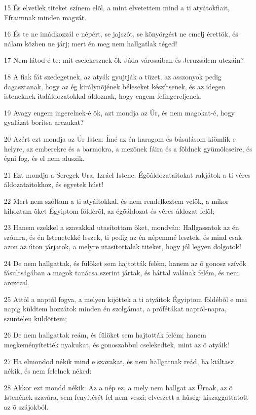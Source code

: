 \par 15 És elvetlek titeket színem elõl, a mint elvetettem mind a ti atyátokfiait, Efraimnak minden magvát.
\par 16 És te ne imádkozzál e népért, se jajszót, se könyörgést ne emelj érettök, és nálam közben ne járj; mert én meg nem hallgatlak téged!
\par 17 Nem látod-é te: mit cselekesznek õk Júda városaiban és Jeruzsálem utczáin?
\par 18 A fiak fát szedegetnek, az atyák gyujtják a tüzet, az asszonyok pedig dagasztanak, hogy az ég királynõjének béleseket készítsenek, és az idegen isteneknek italáldozatokkal áldoznak, hogy engem felingereljenek.
\par 19 Avagy engem ingerelnek-é õk, azt mondja az Úr, és nem magokat-é, hogy gyalázat borítsa arczukat?
\par 20 Azért ezt mondja az Úr Isten: Ímé az én haragom és búsulásom kiömlik e helyre, az emberekre és a barmokra, a mezõnek fáira és a földnek gyümölcseire, és égni fog, és el nem aluszik.
\par 21 Ezt mondja a Seregek Ura, Izráel Istene: Égõáldozataitokat rakjátok a ti véres áldozataitokhoz, és egyetek húst!
\par 22 Mert nem szóltam a ti atyáitokkal, és nem rendelkeztem velök, a mikor kihoztam õket Égyiptom földérõl, az égõáldozat és véres áldozat felõl;
\par 23 Hanem ezekkel a szavakkal utasítottam õket, mondván: Hallgassatok az én szómra, és én  Istenetekké leszek, ti pedig az én népemmé lesztek, és mind csak azon az úton járjatok, a melyre utasítottalak titeket, hogy jól legyen dolgotok!
\par 24 De nem hallgattak, és fülöket sem hajtották felém, hanem az õ gonosz szívök fásultságában a magok tanácsa szerint jártak, és háttal valának felém, és nem arczczal.
\par 25 Attól a naptól fogva, a melyen kijöttek a ti atyáitok Égyiptom földébõl e mai napig küldtem hozzátok minden én szolgámat, a prófétákat napról-napra, szüntelen küldöttem;
\par 26 De nem hallgattak reám, és fülöket sem hajtották felém; hanem megkeményítették nyakukat, és gonoszabbul cselekedtek, mint az õ atyáik!
\par 27 Ha elmondod nékik mind e szavakat, és nem hallgatnak reád, ha kiáltasz nékik, és nem felelnek néked:
\par 28 Akkor ezt mondd nékik: Az a nép ez, a mely nem hallgat az Úrnak, az õ Istenének szavára, sem fenyítését fel nem veszi; elveszett a hûség; kiszaggattatott az õ szájokból.
